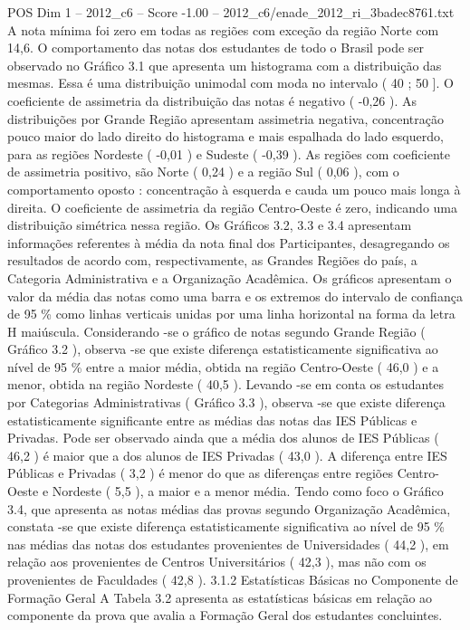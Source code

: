 \begin{textsample}{POS Dim 1 – 2012\_c6 – Score -1.00 – 2012\_c6/enade\_2012\_ri\_3badec8761.txt}
A nota mínima foi zero em todas as regiões com exceção da região Norte com 14,6.
O comportamento das notas dos estudantes de todo o Brasil pode ser observado no Gráfico 3.1 que apresenta um histograma com a distribuição das mesmas.
Essa é uma distribuição unimodal com moda no intervalo ( 40 ; 50 ].
O coeficiente de assimetria da distribuição das notas é negativo ( -0,26 ).
As distribuições por Grande Região apresentam assimetria negativa, concentração pouco maior do lado direito do histograma e mais espalhada do lado esquerdo, para as regiões Nordeste ( -0,01 ) e Sudeste ( -0,39 ).
As regiões com coeficiente de assimetria positivo, são Norte ( 0,24 ) e a região Sul ( 0,06 ), com o comportamento oposto : concentração à esquerda e cauda um pouco mais longa à direita.
O coeficiente de assimetria da região Centro-Oeste é zero, indicando uma distribuição simétrica nessa região.
Os Gráficos 3.2, 3.3 e 3.4 apresentam informações referentes à média da nota final dos Participantes, desagregando os resultados de acordo com, respectivamente, as Grandes Regiões do país, a Categoria Administrativa e a Organização Acadêmica.
Os gráficos apresentam o valor da média das notas como uma barra e os extremos do intervalo de confiança de 95 \% como linhas verticais unidas por uma linha horizontal na forma da letra H maiúscula.
Considerando -se o gráfico de notas segundo Grande Região ( Gráfico 3.2 ), observa -se que existe diferença estatisticamente significativa ao nível de 95 \% entre a maior média, obtida na região Centro-Oeste ( 46,0 ) e a menor, obtida na região Nordeste ( 40,5 ).
Levando -se em conta os estudantes por Categorias Administrativas ( Gráfico 3.3 ), observa -se que existe diferença estatisticamente significante entre as médias das notas das IES Públicas e Privadas.
Pode ser observado ainda que a média dos alunos de IES Públicas ( 46,2 ) é maior que a dos alunos de IES Privadas ( 43,0 ).
A diferença entre IES Públicas e Privadas ( 3,2 ) é menor do que as diferenças entre regiões Centro-Oeste e Nordeste ( 5,5 ), a maior e a menor média.
Tendo como foco o Gráfico 3.4, que apresenta as notas médias das provas segundo Organização Acadêmica, constata -se que existe diferença estatisticamente significativa ao nível de 95 \% nas médias das notas dos estudantes provenientes de Universidades ( 44,2 ), em relação aos provenientes de Centros Universitários ( 42,3 ), mas não com os provenientes de Faculdades ( 42,8 ). 3.1.2 Estatísticas Básicas no Componente de Formação Geral A Tabela 3.2 apresenta as estatísticas básicas em relação ao componente da prova que avalia a Formação Geral dos estudantes concluintes.

\end{textsample}
